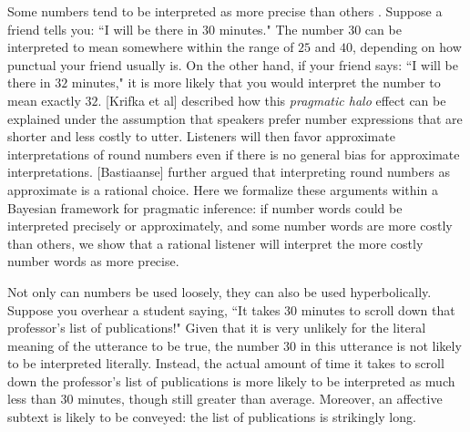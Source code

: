 \documentclass{article} %
\begin{document}
Some numbers tend to be interpreted as more precise than others \cite{lasersohn}. Suppose a friend tells you: ``I will be there in $30$ minutes." The number $30$ can be interpreted to mean somewhere within the range of $25$ and $40$, depending on how punctual your friend usually is. On the other hand, if your friend says: ``I will be there in $32$ minutes," it is more likely that you would interpret the number to mean exactly $32$. 
[Krifka et al] described how this \emph{pragmatic halo} effect can be explained under the assumption that speakers prefer number expressions that are shorter and less costly to utter. Listeners will then favor approximate interpretations of round numbers even if there is no general bias for approximate interpretations. [Bastiaanse] further argued that interpreting round numbers as approximate is a rational choice. Here we formalize these arguments within a Bayesian framework for pragmatic inference: if number words could be interpreted precisely or approximately, and some number words are more costly than others, we show that a rational listener will interpret the more costly number words as more precise.

Not only can numbers be used loosely, they can also be used hyperbolically. Suppose you overhear a student saying, ``It takes 30 minutes to scroll down that professor's list of publications!" Given that it is very unlikely for the literal meaning of the utterance to be true, the number $30$ in this utterance is not likely to be interpreted literally. Instead, the actual amount of time it takes to scroll down the professor's list of publications is more likely to be interpreted as much less than 30 minutes, though still greater than average. Moreover, an affective subtext is likely to be conveyed: the list of publications is strikingly long.
\end{document}
